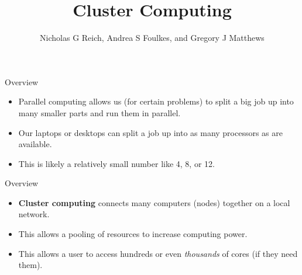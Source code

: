 

\title{Cluster Computing}
\newcommand{\ModuleShortname}{shortName}
\author{Nicholas G Reich, Andrea S Foulkes, and Gregory J Matthews}
\newcommand{\LicenseText}{Made available under the Creative Commons Attribution-ShareAlike 3.0 Unported License: http://creativecommons.org/licenses/by-sa/3.0/deed.en\textunderscore US }
\newcommand{\Instructor}{}
\newcommand{\Course}{}






\begin{frame}[plain]
	\titlepage
\end{frame}

\begin{frame}{Overview}
\begin{itemize}
\item Parallel computing allows us (for certain problems) to split a big job up into many smaller parts and run them in parallel.  
\item Our laptops or desktops can split a job up into as many processors as are available.  
\item This is likely a relatively small number like 4, 8, or 12. 
 \end{itemize}
\end{frame}

\begin{frame}{Overview}
\begin{itemize}
\item {\bf Cluster computing} connects many computers (nodes) together on a local network. 
\item This allows a pooling of resources to increase computing power.
\item This allows a user to access hundreds or even {\it thousands} of cores (if they need them). 
\end{itemize}
\end{frame}

